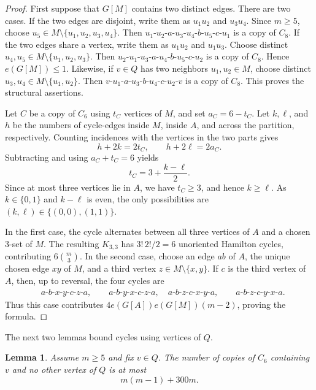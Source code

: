\documentclass[11pt,letterpaper]{article}
\newtheorem{lemma}[theorem]{Lemma}
\begin{document}
\begin{proof}
First suppose that \(G[M]\) contains two distinct edges. There are two cases. If the two edges are
disjoint, write them as \(u_1u_2\) and \(u_3u_4\). Since \(m\ge5\), choose
\(u_5\in M\setminus\{u_1,u_2,u_3,u_4\}\). Then $u_1$-$u_2$-$a$-$u_3$-$u_4$-$b$-$u_5$-$c$-$u_1$
is a copy of \(C_8\). If the two edges share a vertex, write them as \(u_1u_2\) and \(u_1u_3\). Choose
distinct \(u_4,u_5\in M\setminus\{u_1,u_2,u_3\}\). Then $u_2$-$u_1$-$u_3$-$a$-$u_4$-$b$-$u_5$-$c$-$u_2$
is a copy of \(C_8\). Hence \(e(G[M])\le1\).
Likewise, if \(v\in Q\) has two neighbors \(u_1,u_2\in M\), choose distinct
\(u_3,u_4\in M\setminus\{u_1,u_2\}\). Then
  $v$-$u_1$-$a$-$u_3$-$b$-$u_4$-$c$-$u_2$-$v$
is a copy of \(C_8\). This proves the structural assertions.

Let \(C\) be a copy of \(C_6\) using \(t_C\) vertices of \(M\), and set \(a_C=6-t_C\). Let
\(k,\ell\), and \(h\) be the numbers of cycle-edges inside \(M\), inside \(A\), and across the
partition, respectively. Counting incidences with the vertices in the two parts gives
\[
  h+2k=2t_C,
  \qquad
  h+2\ell=2a_C.
\]
Subtracting and using \(a_C+t_C=6\) yields
\[
  t_C=3+\frac{k-\ell}{2}.
\]
Since at most three vertices lie in \(A\), we have \(t_C\ge3\), and hence \(k\ge\ell\). As
\(k\in\{0,1\}\) and \(k-\ell\) is even, the only possibilities are
\((k,\ell)\in\{(0,0),(1,1)\}\).

In the first case, the cycle alternates between all three vertices of \(A\) and a chosen 3-set of \(M\).
The resulting \(K_{3,3}\) has \(3!\,2!/2=6\) unoriented Hamilton cycles, contributing
\(6\binom m3\). In the second case, choose an edge \(ab\) of \(A\), the unique chosen edge \(xy\)
of \(M\), and a third vertex \(z\in M\setminus\{x,y\}\). If \(c\) is the third vertex of \(A\), then,
up to reversal, the four cycles are
\begin{align*}
  &a\text{-}b\text{-}x\text{-}y\text{-}c\text{-}z\text{-}a,\qquad a\text{-}b\text{-}y\text{-}x\text{-}c\text{-}z\text{-}a,\quad
  a\text{-}b\text{-}z\text{-}c\text{-}x\text{-}y\text{-}a,\qquad a\text{-}b\text{-}z\text{-}c\text{-}y\text{-}x\text{-}a.
\end{align*}
Thus this case contributes \(4e(G[A])e(G[M])(m-2)\), proving the formula.
\end{proof}

The next two lemmas bound cycles using vertices of \(Q\).

\begin{lemma}\label{lem:one-defect}
Assume \(m\ge5\) and fix \(v\in Q\). The number of copies of \(C_6\) containing \(v\) and no
other vertex of \(Q\) is at most
\[
  m(m-1)+300m.
\]
\end{lemma}
\end{document}
